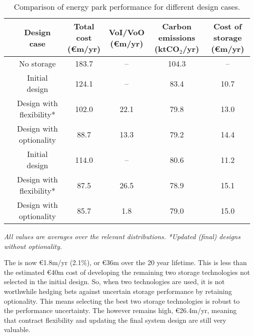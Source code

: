 \begin{table}[h]
    \centering
    \renewcommand{\arraystretch}{1.25}
    \begin{tabular}{cccccc} \toprule \toprule
        & Design case & \makecell{Total cost\\({\euro}m/yr)} & \makecell{VoI/{\color{gray!50!black}VoO}\\({\euro}m/yr)} & \makecell{Carbon emissions\\(ktCO$_2$/yr)} & \makecell{Cost of storage\\({\euro}m/yr)} \\
        \midrule \midrule
        & No storage & 183.7 & -- & 104.3 & -- \\
        \arrayrulecolor{black!50}\midrule
        \parbox[t]{2mm}{}
        & Initial design & 124.1 & -- & 83.4 & 10.7 \\
        & Design with flexibility* & 102.0 & 22.1 & 79.8 & 13.0 \\
        & Design with optionality & 88.7 & {\color{gray!50!black}13.3} & 79.2 & 14.4 \\
        \midrule
        \parbox[t]{2mm}{}
        & Initial design & 114.0 & -- & 80.6 & 11.2 \\
        & Design with flexibility* & 87.5 & 26.5 & 78.9 & 15.1 \\
        & Design with optionality & 85.7 & {\color{gray!50!black}1.8} & 79.0 & 15.0 \\
        \bottomrule \bottomrule
    \end{tabular}
    \smallskip
    \caption{Comparison of energy park performance for different design cases.}
    \label{tab:parks-two-techs-comparison}
    \footnotesize{\it All values are averages over the relevant distributions. *Updated (final) designs without optionality.}
\end{table}

The  is now {\euro}1.8m/yr (2.1\%), or {\euro}36m over the 20 year lifetime. This is less than the estimated {\euro}40m cost of developing the remaining two storage technologies not selected in the initial design. So, when two technologies are used, it is not worthwhile hedging bets against uncertain storage performance by retaining optionality. This means selecting the best two storage technologies is robust to the performance uncertainty. The  however remains high, {\euro}26.4m/yr, meaning that contract flexibility and updating the final system design are still very valuable.


